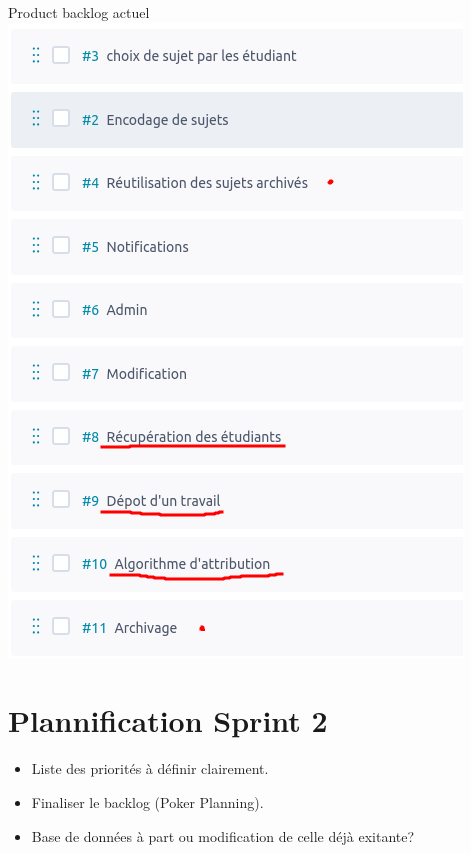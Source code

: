 \documentclass[numbering=fraction]{beamer}
\begin{document}
\begin{frame}{Product backlog actuel}
\centering
\includegraphics[height=0.8\textheight]{backlog.png}
\end{frame}

\section{Plannification Sprint 2}

\begin{frame}{}
    \begin{itemize}
        \item Liste des priorités à définir clairement.
        \item Finaliser le backlog (Poker Planning).
        \item Base de données à part ou modification de celle déjà exitante?
    \end{itemize}
\end{frame}
\end{document}
